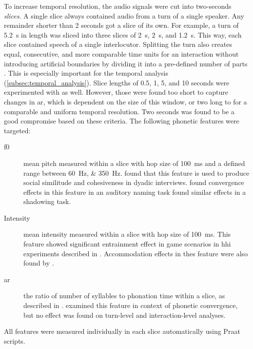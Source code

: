 To increase temporal resolution, the audio signals were cut into two-seconds \emph{slices}.
A single slice always contained audio from a turn of a single speaker.
Any remainder shorter than \si{2} seconds got a slice of its own.
For example, a turn of \SI{5.2}{\second} in length was sliced into three slices of \SI{2}{\second}, \SI{2}{\second}, and \SI{1.2}{\second}.
This way, each slice contained speech of a single interlocutor.
Splitting the turn also creates equal, consecutive, and more comparable time units for an interaction without introducing artificial boundaries by dividing it into a pre-defined number of parts \citep[as in][]{Silber-Varod2018prosodic}.
This is especially important for the temporal analysis (\cref{subsec:temporal_analysis}).
Slice lengths of 0.5, 1, 5, and 10 seconds were experimented with as well.
However, those were found too short to capture changes in \ac{ar}, which is dependent on the size of this window, or two long to for a comparable and uniform temporal resolution.
Two seconds was found to be a good compromise based on these criteria.
%
The following phonetic features were targeted: 
%
\begin{description}%
	\item[\Acf{f0}] mean pitch measured within a slice with hop size of \SI{100}{\milli\second} and a defined range between \SIlist{60;350}{\hertz}.
	\citet{Gregory1993Voice} found that this feature is used to produce social similitude and cohesiveness in dyadic interviews.
	\citet{Babel2012role} found convergence effects in this feature in an auditory naming task\citet{Bulatov2009effect} found similar effects in a shadowing task.
	
	\item[Intensity] mean intensity measured within a slice with hop size of \SI{100}{\milli\second}.
	This feature showed significant entrainment effect in game scenarios in \ac{hhi} experiments described in \citet{Levitan2011measuring}.
	Accommodation effects in thes feature were also found by \citet{Natale1975convergence}.
	
	\item[\Acf{ar}] the ratio of number of syllables to phonation time within a slice, as described in \citet{DeJong2009arcitulcationrate}.
	\citet{Schweitzer2013convergence} examined this feature in context of phonetic convergence, but no effect was found on turn-level and interaction-level analyses.
\end{description}
%
All features were measured individually in each slice automatically using Praat \citep{Boersma2001praat} scripts.

